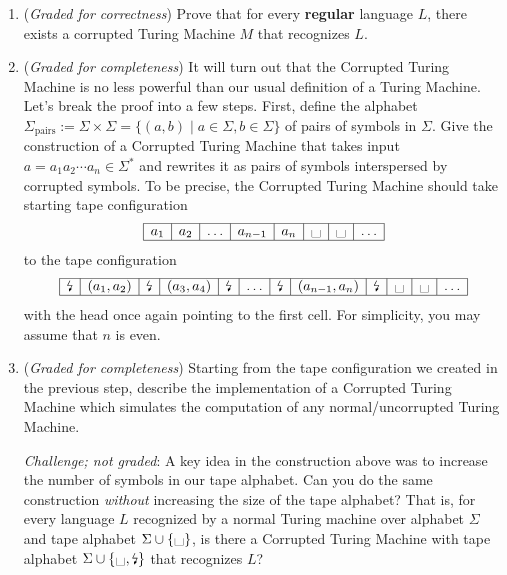 \documentclass[12pt, oneside]{article}
\newcommand{\gradeCorrect}{({\it Graded for correctness}) }
\newcommand{\gradeComplete}{({\it Graded for completeness}) }
\newcommand{\blank}{\scalebox{1.5}{\textvisiblespace}}
\begin{document}
\begin{enumerate}
\begin{enumerate}
\item\gradeCorrect Prove that for every {\bf regular} language $L$, there exists a corrupted 
Turing Machine $M$ that recognizes $L$.

\item\gradeComplete It will turn out that the Corrupted Turing Machine is no less powerful than our 
usual definition of a Turing Machine. Let's break the proof into a few steps. First, define the 
alphabet $\Sigma_{\mathrm{pairs}}:= \Sigma \times \Sigma = \{ (a,b) \mid a \in \Sigma, b \in \Sigma\}$ 
of pairs of symbols in $\Sigma$. Give the construction of a Corrupted Turing Machine that takes 
input $a = a_1 a_2 \cdots a_n \in \Sigma^*$ and rewrites it as pairs of symbols interspersed 
by corrupted symbols. To be precise, the Corrupted Turing Machine should take starting tape configuration
\[
\begin{array}{| c | c | c | c | c | c | c | c | }  \hline
a_1 & a_2 & \ldots & a_{n-1} & a_{n} & \blank & \blank & \ldots \\ \hline
\end{array}
\]
to the tape configuration 
\[
\begin{array}{| c | c | c | c | c | c | c | c | c | c | c | c| }  \hline
\corrupted & (a_1, a_2) & \corrupted & (a_3,a_4) & \corrupted & \ldots& \corrupted 
& (a_{n-1}, a_{n}) & \corrupted & \blank & \blank & \ldots \\ \hline
\end{array}
\]
with the head once again pointing to the first cell. For simplicity, you may assume that $n$ is even.

\item\gradeComplete Starting from the tape configuration we created in the previous step, 
describe the implementation of a Corrupted Turing Machine which simulates the computation of 
any normal/uncorrupted Turing Machine.

\vspace{1em}
\noindent\textit{Challenge; not graded}: A key idea in the construction above was 
to increase the number of symbols in our tape alphabet. Can you do the same construction 
\emph{without} increasing the size of the tape alphabet? That is, for every language $L$ 
recognized by a normal Turing machine over alphabet $\Sigma$ and tape alphabet $\Sigma \cup \{\blank\}$, 
is there a Corrupted Turing Machine with tape alphabet $\Sigma \cup \{\blank,\corrupted\}$ that recognizes $L$?

\end{enumerate}




\end{enumerate}
\end{document}
